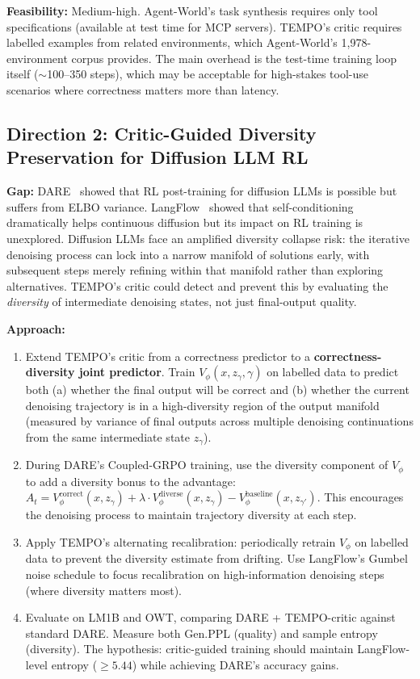 \documentclass[11pt]{article}
\begin{document}
\textbf{Feasibility:} Medium-high. Agent-World's task synthesis requires only tool specifications (available at test time for MCP servers). TEMPO's critic requires labelled examples from related environments, which Agent-World's 1,978-environment corpus provides. The main overhead is the test-time training loop itself ($\sim$100--350 steps), which may be acceptable for high-stakes tool-use scenarios where correctness matters more than latency.

\subsection{Direction 2: Critic-Guided Diversity Preservation for Diffusion LLM RL}

\textbf{Gap:} DARE~\cite{dare} showed that RL post-training for diffusion LLMs is possible but suffers from ELBO variance. LangFlow~\cite{langflow} showed that self-conditioning dramatically helps continuous diffusion but its impact on RL training is unexplored. Diffusion LLMs face an amplified diversity collapse risk: the iterative denoising process can lock into a narrow manifold of solutions early, with subsequent steps merely refining within that manifold rather than exploring alternatives. TEMPO's critic could detect and prevent this by evaluating the \textit{diversity} of intermediate denoising states, not just final-output quality.

\textbf{Approach:}
\begin{enumerate}
    \item Extend TEMPO's critic from a correctness predictor to a \textbf{correctness-diversity joint predictor}. Train $V_\phi(x, z_\gamma, \gamma)$ on labelled data to predict both (a) whether the final output will be correct and (b) whether the current denoising trajectory is in a high-diversity region of the output manifold (measured by variance of final outputs across multiple denoising continuations from the same intermediate state $z_\gamma$).

    \item During DARE's Coupled-GRPO training, use the diversity component of $V_\phi$ to add a diversity bonus to the advantage: $A_t = V_\phi^{\mathrm{correct}}(x, z_\gamma) + \lambda \cdot V_\phi^{\mathrm{diverse}}(x, z_\gamma) - V_\phi^{\mathrm{baseline}}(x, z_{\gamma'})$. This encourages the denoising process to maintain trajectory diversity at each step.

    \item Apply TEMPO's alternating recalibration: periodically retrain $V_\phi$ on labelled data to prevent the diversity estimate from drifting. Use LangFlow's Gumbel noise schedule to focus recalibration on high-information denoising steps (where diversity matters most).

    \item Evaluate on LM1B and OWT, comparing DARE + TEMPO-critic against standard DARE. Measure both Gen.PPL (quality) and sample entropy (diversity). The hypothesis: critic-guided training should maintain LangFlow-level entropy ($\geq 5.44$) while achieving DARE's accuracy gains.
\end{enumerate}
\end{document}
